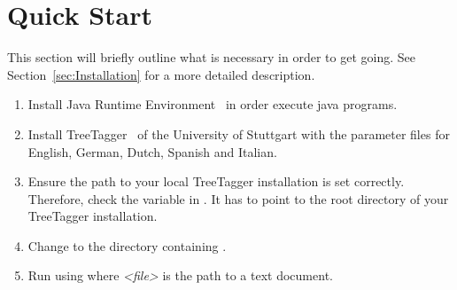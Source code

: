 \section{Quick Start}\label{sec:QuickStart}
This section will briefly outline what is necessary in order to get \product{} going. See Section~\ref{sec:Installation} for a more detailed description.
\begin{enumerate}
\item Install Java Runtime Environment~\cite{Java} in order execute java programs.
\item Install TreeTagger~\cite{TreeTagger} of the University of Stuttgart with the parameter files for English, German, Dutch, Spanish and Italian.
\item Ensure the path to your local TreeTagger installation is set correctly. Therefore, check the variable  in \configFile{}. It has to point to the root directory of your TreeTagger installation.
\item Change to the directory containing \executableFile{}.
\item Run \product{} using \newline {} \newline where \emph{<file>} is the path to a text document.
\end{enumerate}
